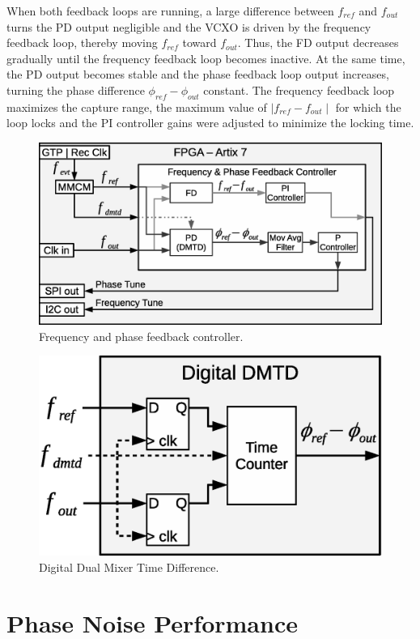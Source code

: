 \documentclass[a4paper,
               biblatex,      %
               ]{jacow}
\begin{document}
When both feedback loops are running, a large difference between $f_{ref}$ and $f_{out}$ turns the PD output negligible and the VCXO is driven by the frequency feedback loop, thereby moving $f_{ref}$ toward $f_{out}$. Thus, the FD output decreases gradually until the frequency feedback loop becomes inactive. At the same time, the PD output becomes stable and the phase feedback loop output increases, turning the phase difference $\phi_{ref}-\phi_{out}$ constant. The frequency feedback loop maximizes the capture range, the maximum value of ${\mid f_{ref}-f_{out} \mid}$ for which the loop locks and the PI controller gains were adjusted to minimize the locking time.

\begin{figure}[!htb]
   \centering
   \includegraphics*[width=0.9\columnwidth]{AFCFPGADMTD}
   \caption{Frequency and phase feedback controller.}
   \label{fig:AFCFPGADMTD}
\end{figure}

\begin{figure}[!htb]
   \centering
   \includegraphics*[width=0.8\columnwidth]{DigitalDMTD}
   \caption{Digital Dual Mixer Time Difference.}
   \label{fig:DigitalDMTD}
\end{figure}

\section{Phase Noise Performance}
\end{document}

